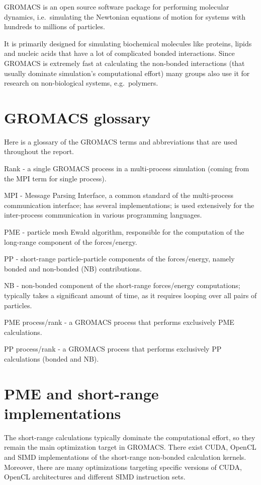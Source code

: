 \documentclass[12pt,a4paper]{report}
\begin{document}
GROMACS \cite{gromacshome} is an open source software package for performing molecular dynamics, i.e.~simulating the Newtonian equations of motion for systems with hundreds to millions of particles. 

It is primarily designed for simulating biochemical molecules like proteins, lipids and nucleic acids that have a lot of complicated bonded interactions. Since GROMACS is extremely fast at calculating the non-bonded interactions (that usually dominate simulation's computational effort) many groups also use it for research on non-biological systems, e.g.~polymers.

\section{GROMACS glossary}
Here is a glossary of the GROMACS terms and abbreviations that are used throughout the report.

Rank - a single GROMACS process in a multi-process simulation (coming from the MPI term for single process).

MPI - Message Parsing Interface, a common standard of the multi-process communication interface; has several implementations; is used extensively for the inter-process communication in various programming languages.

PME - particle mesh Ewald algorithm, responsible for the computation of the long-range component of the forces/energy.

PP - short-range particle-particle components of the forces/energy, namely bonded and non-bonded (NB) contributions.

NB - non-bonded component of the short-range forces/energy computations; typically takes a significant amount of time, as it requires looping over all pairs of particles. 

PME process/rank - a GROMACS process that performs exclusively PME calculations.

PP process/rank - a GROMACS process that performs exclusively PP calculations (bonded and NB).  

\section{PME and short-range implementations} \label{rangeimpl}

The short-range calculations typically dominate the computational effort, so they remain the main optimization target in GROMACS. There exist CUDA, OpenCL and SIMD implementations of the short-range non-bonded calculation kernels. Moreover, there are many optimizations targeting specific versions of CUDA, OpenCL architectures and different SIMD instruction sets. 
\end{document}
